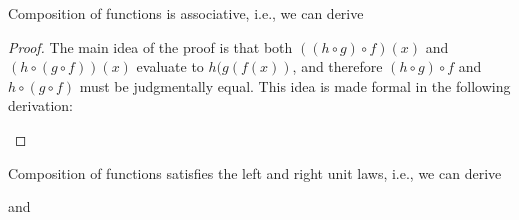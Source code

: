 \begin{lem}
Composition of functions is associative, i.e., we can derive
\begin{prooftree}
\end{prooftree}
\end{lem}

\begin{proof}
  The main idea of the proof is that both $((h\circ g)\circ f)(x)$ and $(h\circ (g\circ f))(x)$ evaluate to $h(g(f(x))$, and therefore $(h\circ g)\circ f$ and $h\circ(g\circ f)$ must be judgmentally equal. This idea is made formal in the following derivation:
  \begin{prooftree}
  \end{prooftree}
\end{proof}

\begin{lem}\label{lem:fun_unit}
Composition of functions satisfies the left and right unit laws, i.e., we can derive
\begin{prooftree}
\end{prooftree}
and
\begin{prooftree}
\end{prooftree}
\end{lem}

